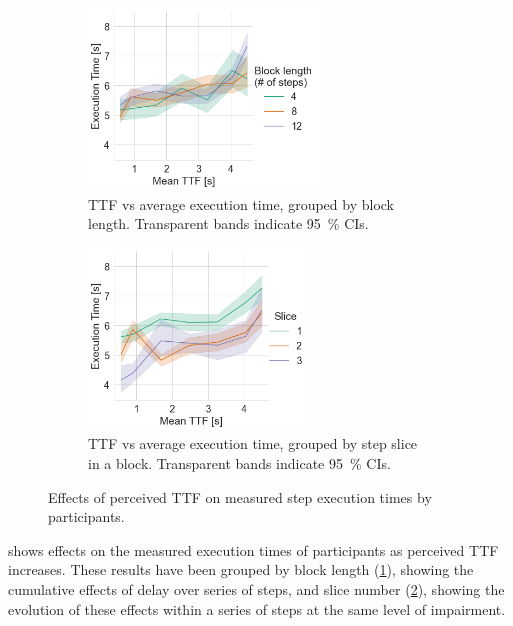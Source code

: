 \begin{figure}[tb]
    \centering
    \begin{subfigure}[t]{0.45\textwidth}
        \includegraphics[height=13em]{./Figs/2021Impact/ttf_vs_exectime_per_block}
        \caption{%
            \gls{TTF} vs average execution time, grouped by block length.
            Transparent bands indicate \SI{95}{\percent} \glspl{CI}.
        }\label{fig:ttfvsexectime:block}
    \end{subfigure}%
    \hfill%
    \begin{subfigure}[t]{0.45\textwidth}
        \includegraphics[height=13em]{./Figs/2021Impact/ttf_vs_exectime_per_slice}
        \caption{%
            \gls{TTF} vs average execution time, grouped by step slice in a block.
            Transparent bands indicate \SI{95}{\percent} \glspl{CI}.
        }\label{fig:ttfvsexectime:slice}
    \end{subfigure}%
    \caption{Effects of perceived \gls{TTF} on measured step execution times by participants.}\label{fig:ttfvsexectime}
\end{figure}

 shows effects on the measured execution times of participants as perceived \gls{TTF} increases.
These results have been grouped by block length (\cref{fig:ttfvsexectime:block}), showing the cumulative effects of delay over series of steps, and slice number (\cref{fig:ttfvsexectime:slice}), showing the evolution of these effects within a series of steps at the same level of impairment.

